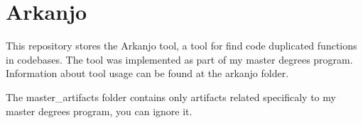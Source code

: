\chapter{Arkanjo}
\hypertarget{index}{}\label{index}
\label{index_md_README}%
%


This repository stores the Arkanjo tool, a tool for find code duplicated functions in codebases. The tool was implemented as part of my master degree\textquotesingle{}s program. Information about tool usage can be found at the arkanjo folder.

The {\ttfamily master\+\_\+artifacts} folder contains only artifacts related specificaly to my master degree\textquotesingle{}s program, you can ignore it. 